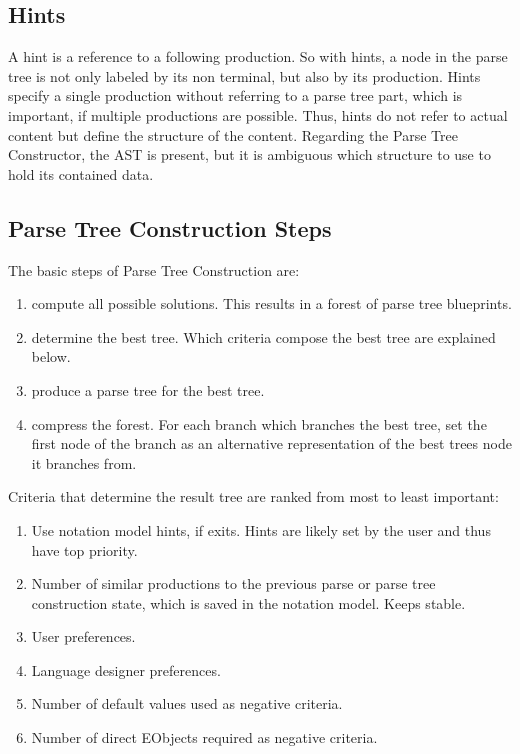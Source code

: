 
\subsection{Hints}
A hint is a reference to a following production. So with hints, a node in the parse tree is not only labeled by its non terminal, but also by its production. Hints specify a single production without referring to a parse tree part, which is important, if multiple productions are possible. Thus, hints do not refer to actual content but define the structure of the content. Regarding the Parse Tree Constructor, the AST is present, but it is ambiguous which structure to use to hold its contained data.  

\subsection{Parse Tree Construction Steps}
The basic steps of Parse Tree Construction are:
\begin{enumerate}
	\item compute all possible solutions. This results in a forest of parse tree blueprints.
	\item determine the best tree. Which criteria compose the best tree are explained below.
	\item produce a parse tree for the best tree. 
	\item compress the forest. For each branch which branches the best tree, set the first node of the branch as an alternative representation of the best trees node it branches from.\\
\end{enumerate}

Criteria that determine the result tree are ranked from most to least important:
\begin{enumerate}
	\item Use notation model hints, if exits. Hints are likely set by the user and thus have top priority.
	\item Number of similar productions to the previous parse or parse tree construction state, which is saved in the notation model. Keeps stable.
	\item User preferences.
	\item Language designer preferences.
	\item Number of default values used as negative criteria.
	\item Number of direct EObjects required as negative criteria.
\end{enumerate}


